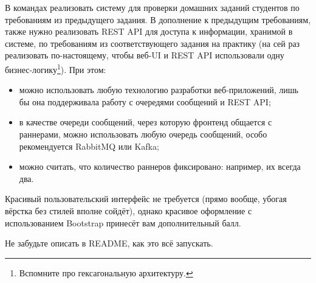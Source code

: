 \documentclass[a5paper]{homework}
\begin{document}

В командах реализовать систему для проверки домашних заданий студентов по требованиям из предыдущего задания. В дополнение к предыдущим требованиям, также нужно реализовать REST API для доступа к информации, хранимой в системе, по требованиям из соответствующего задания на практику (на сей раз реализовать по-настоящему, чтобы веб-UI и REST API использовали одну бизнес-логику\footnote{Вспомните про гексагональную архитектуру.}). При этом:

\begin{itemize}
    \item можно использовать любую технологию разработки веб-приложений, лишь бы она поддерживала работу с очередями сообщений и REST API;
    \item в качестве очереди сообщений, через которую фронтенд общается с раннерами, можно использовать любую очередь сообщений, особо рекомендуется RabbitMQ или Kafka;
    \item можно считать, что количество раннеров фиксировано: например, их всегда два.
\end{itemize}

Красивый пользовательский интерфейс не требуется (прямо вообще, убогая вёрстка без стилей вполне сойдёт), однако красивое оформление с использованием Bootstrap принесёт вам дополнительный балл.

Не забудьте описать в README, как это всё запускать.
\end{document}
